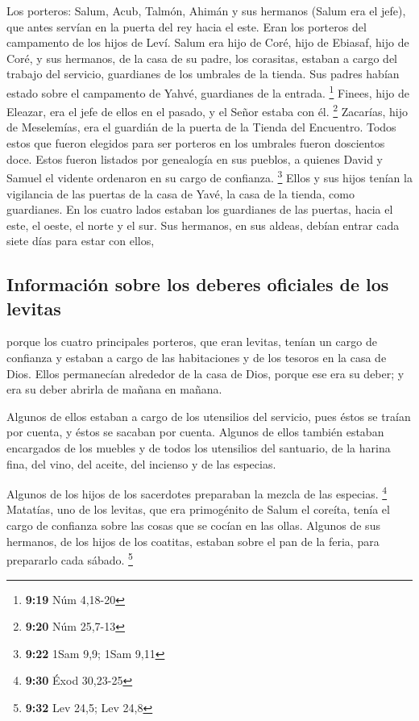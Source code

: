  Los porteros: Salum, Acub, Talmón, Ahimán y sus hermanos
(Salum era el jefe),  que antes servían en la puerta del
rey hacia el este. Eran los porteros del campamento de los hijos de
Leví.  Salum era hijo de Coré, hijo de Ebiasaf, hijo de
Coré, y sus hermanos, de la casa de su padre, los corasitas, estaban a
cargo del trabajo del servicio, guardianes de los umbrales de la tienda.
Sus padres habían estado sobre el campamento de Yahvé, guardianes de la
entrada. \footnote{\textbf{9:19} Núm 4,18-20}  Finees,
hijo de Eleazar, era el jefe de ellos en el pasado, y el Señor estaba
con él. \footnote{\textbf{9:20} Núm 25,7-13}  Zacarías,
hijo de Meselemías, era el guardián de la puerta de la Tienda del
Encuentro.  Todos estos que fueron elegidos para ser
porteros en los umbrales fueron doscientos doce. Estos fueron listados
por genealogía en sus pueblos, a quienes David y Samuel el vidente
ordenaron en su cargo de confianza. \footnote{\textbf{9:22} 1Sam 9,9;
  1Sam 9,11}  Ellos y sus hijos tenían la vigilancia de
las puertas de la casa de Yavé, la casa de la tienda, como guardianes.
 En los cuatro lados estaban los guardianes de las
puertas, hacia el este, el oeste, el norte y el sur.  Sus
hermanos, en sus aldeas, debían entrar cada siete días para estar con
ellos,

\hypertarget{informaciuxf3n-sobre-los-deberes-oficiales-de-los-levitas}{%
\subsection{Información sobre los deberes oficiales de los
levitas}\label{informaciuxf3n-sobre-los-deberes-oficiales-de-los-levitas}}

 porque los cuatro principales porteros, que eran
levitas, tenían un cargo de confianza y estaban a cargo de las
habitaciones y de los tesoros en la casa de Dios.  Ellos
permanecían alrededor de la casa de Dios, porque ese era su deber; y era
su deber abrirla de mañana en mañana.

 Algunos de ellos estaban a cargo de los utensilios del
servicio, pues éstos se traían por cuenta, y éstos se sacaban por
cuenta.  Algunos de ellos también estaban encargados de
los muebles y de todos los utensilios del santuario, de la harina fina,
del vino, del aceite, del incienso y de las especias.

 Algunos de los hijos de los sacerdotes preparaban la
mezcla de las especias. \footnote{\textbf{9:30} Éxod 30,23-25}
 Matatías, uno de los levitas, que era primogénito de
Salum el coreíta, tenía el cargo de confianza sobre las cosas que se
cocían en las ollas.  Algunos de sus hermanos, de los
hijos de los coatitas, estaban sobre el pan de la feria, para prepararlo
cada sábado. \footnote{\textbf{9:32} Lev 24,5; Lev 24,8}

